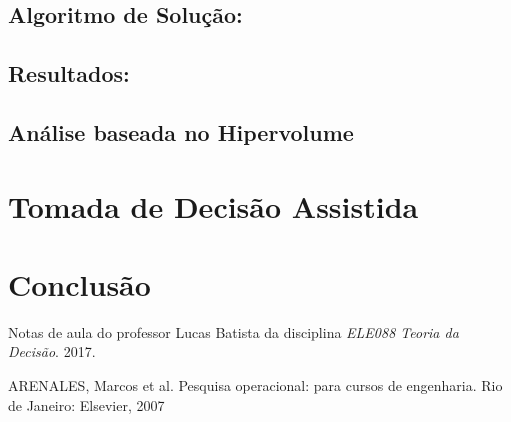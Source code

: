 \documentclass[conference]{IEEEtran}
\begin{document}
\subsection{Algoritmo de Solução:}


\subsection{Resultados:}


\subsection{Análise baseada no Hipervolume}


\section{Tomada de Decisão Assistida}

\section{Conclusão}


\begin{thebibliography}{1}

Notas de aula do professor Lucas Batista da disciplina \emph{ELE088 Teoria da Decisão}. 2017.

ARENALES, Marcos et al. Pesquisa operacional: para cursos de engenharia. Rio de Janeiro: Elsevier, 2007

\end{thebibliography}


\end{document}
